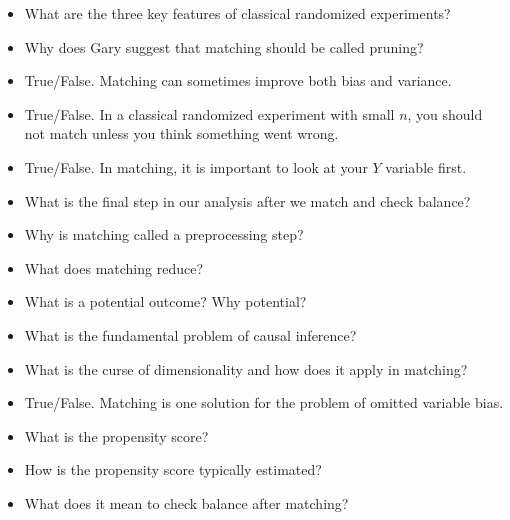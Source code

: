\documentclass[11pt]{article}
\begin{document}
\begin{itemize}

\item What are the three key features of classical randomized experiments?

\item Why does Gary suggest that matching should be called pruning?

\item True/False.  Matching can sometimes improve both bias and variance.

\item True/False.  In a classical randomized experiment with small $n$, you should not match unless you think something went wrong.

\item True/False.  In matching, it is important to look at your $Y$ variable first.

\item What is the final step in our analysis after we match and check balance?

\item Why is matching called a preprocessing step?

\item What does matching reduce?

\item What is a potential outcome?  Why potential?

\item What is the fundamental problem of causal inference?

\item What is the curse of dimensionality and how does it apply in matching?

\item True/False. Matching is one solution for the problem of omitted variable bias.

\item What is the propensity score?

\item How is the propensity score typically estimated?

\item What does it mean to check balance after matching?
\end{itemize}
\end{document}
